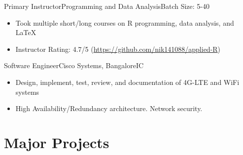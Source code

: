 \documentclass[11pt,a4paper,]{moderncv}
\begin{document}
    {Primary Instructor}{Programming and Data Analysis}{}{Batch Size: 5-40}{
    \begin{itemize}
        \item Took multiple short/long courses on R programming, data analysis, and LaTeX
        \item Instructor Rating: 4.7/5 (\url{https://github.com/nik141088/applied-R})
    \end{itemize}
    }
    {Software Engineer}{Cisco Systems, Bangalore}{}{IC}{
    \begin{itemize}
        \item Design, implement, test, review, and documentation of 4G-LTE and WiFi systems
        \item High Availability/Redundancy architecture. Network security.
    \end{itemize}
    }


\hypertarget{major-projects}{
\section{Major Projects}\label{major-projects}}
\end{document}

